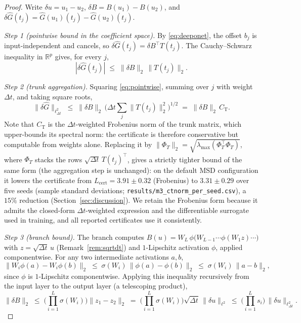 \documentclass[11pt]{article}
\newcommand{\Ghat}{\hat{G}}
\newcommand{\Lhat}{L_{\mathrm{cert}}}
\begin{document}
\begin{proof}
Write $\delta u = u_1-u_2$, $\delta B = B(u_1)-B(u_2)$, and
$\delta\Ghat(t_j) = \Ghat(u_1)(t_j)-\Ghat(u_2)(t_j)$.

\emph{Step 1 (pointwise bound in the coefficient space).} By
\eqref{eq:deeponet}, the offset $b_j$ is input-independent and cancels, so
$\delta\Ghat(t_j) = \delta B^{\top} T(t_j)$. The Cauchy--Schwarz
inequality in $\mathbb{R}^p$ gives, for every $j$,
\begin{equation}
  |\delta\Ghat(t_j)| \;\le\; \|\delta B\|_2\,\|T(t_j)\|_2 .
  \label{eq:pointwise}
\end{equation}

\emph{Step 2 (trunk aggregation).} Squaring \eqref{eq:pointwise}, summing
over $j$ with weight $\Delta t$, and taking square roots,
\begin{equation}
  \|\delta\Ghat\|_{\ell^2_{\Delta t}}
  \;\le\; \|\delta B\|_2\,
  \Big(\Delta t\sum_j \|T(t_j)\|_2^2\Big)^{\!1/2}
  \;=\; \|\delta B\|_2\, C_{\mathrm{T}} .
  \label{eq:trunkbound}
\end{equation}
Note that $C_{\mathrm{T}}$ is the $\Delta t$-weighted Frobenius norm of the
trunk matrix, which upper-bounds its spectral norm: the certificate is
therefore conservative but computable from weights alone. Replacing it by
$\|\Phi_T\|_2=\sqrt{\lambda_{\max}(\Phi_T^{\top}\Phi_T)}$, where
$\Phi_T$ stacks the rows $\sqrt{\Delta t}\,T(t_j)^{\top}$, gives a
strictly tighter bound of the same form (the aggregation step is unchanged):
on the default MSD configuration it lowers the certificate from
$\Lhat=3.91\pm0.32$ (Frobenius) to $3.31\pm0.29$ over five seeds (sample
standard deviations; \texttt{results/m3\_ctnorm\_per\_seed.csv}), a $15\%$
reduction (Section~\ref{sec:discussion}). We retain the Frobenius form
because it admits the closed-form $\Delta t$-weighted expression and the
differentiable surrogate used in training, and all reported certificates use
it consistently.

\emph{Step 3 (branch bound).} The branch computes
$B(u) = W_L\,\phi\!\big(W_{L-1}\cdots\phi(W_1 z)\cdots\big)$ with
$z=\sqrt{\Delta t}\,u$ (Remark~\ref{rem:sqrtdt}) and $1$-Lipschitz
activation $\phi$, applied componentwise. For any two intermediate
activations $a,b$,
\begin{equation}
  \|W_i\phi(a)-W_i\phi(b)\|_2
  \;\le\; \sigma(W_i)\,\|\phi(a)-\phi(b)\|_2
  \;\le\; \sigma(W_i)\,\|a-b\|_2 ,
\end{equation}
since $\phi$ is $1$-Lipschitz componentwise. Applying this inequality
recursively from the input layer to the output layer (a telescoping
product),
\begin{equation}
  \|\delta B\|_2 \;\le\; \Big(\prod_{i=1}^{L}\sigma(W_i)\Big)\|z_1-z_2\|_2
  \;=\; \Big(\prod_{i=1}^{L}\sigma(W_i)\Big)\sqrt{\Delta t}\,\|\delta u\|_{\ell^2}
  \;\le\; \Big(\prod_{i=1}^{L} s_i\Big)\,\|\delta u\|_{\ell^2_{\Delta t}} .
  \label{eq:branchbound}
\end{equation}


\end{proof}
\end{document}

